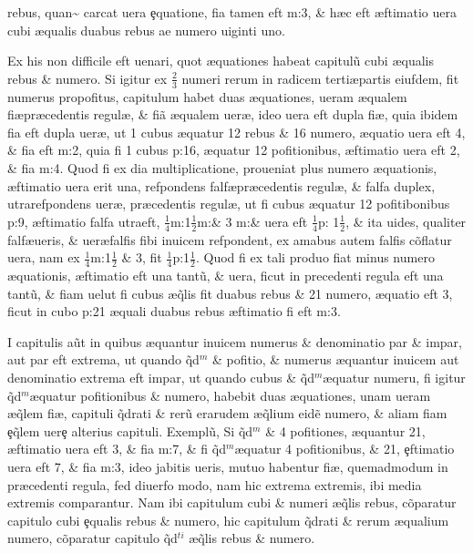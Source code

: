 rebus, quan\~{\que} carcat uera \c{e}quatione, fi{\ct}a tamen eft m:3, \& h{\ae}c eft {\ae}ftimatio uera cubi {\ae}qualis duabus rebus ae numero uiginti uno.

 Ex his non difficile eft uenari, quot {\ae}quationes habeat capitul\~{u} cubi {\ae}qualis rebus \& numero. Si igitur ex \( \tfrac{2}{3} \) numeri rerum in radicem terti\ae partis eiufdem, fit numerus propofitus, capitulum habet duas {\ae}quationes, ueram {\ae}qualem fi{\ct}\ae pr{\ae}cedentis regul{\ae}, \& fi{\ct}\~{a} {\ae}qualem uer{\ae}, ideo uera eft dupla fi{\ct\ae}, quia ibidem fi{\ct}a eft dupla uer{\ae}, ut 1 cubus {\ae}quatur 12 rebus \& 16 numero, {\ae}quatio uera eft 4, \& fi{\ct}a eft m:2, quia fi 1 cubus p:16, {\ae}quatur 12 pofitionibus, {\ae}ftimatio uera eft 2, \& fi{\ct}a m:4. Quod fi ex di{\ct}a multiplicatione, proueniat plus numero {\ae}quationis, {\ae}ftimatio uera erit una, refpondens falf\ae pr{\ae}cedentis regul{\ae}, \& falfa duplex, utra\que refpondens uer{\ae}, pr{\ae}cedentis regul{\ae}, ut fi cubus {\ae}quatur 12 pofitibonibus p:9, {\ae}ftimatio falfa utra\que eft, \( \tfrac{1}{4} \)m:1\( \tfrac{1}{2} \)m:\& 3 m:\& uera eft \( \tfrac{1}{4} \)p: 1\( \tfrac{1}{2} \), \& ita uides, qualiter falf\ae ueris, \& uer\ae  falfis fibi inuicem refpondent, ex amabus autem falfis c\~{o}flatur uera, nam ex \( \tfrac{1}{4} \)m:1\( \tfrac{1}{2} \) \& 3, fit \( \tfrac{1}{4} \)p:1\( \tfrac{1}{2} \). Quod fi ex tali produ{\ct}o fiat minus numero {\ae}quationis, {\ae}ftimatio eft una  tant\~{u}, \& uera, ficut in precedenti regula eft una tant\~{u}, \& fi{\ct}am uelut fi cubus {\ae}\~{q}lis fit duabus rebus \& 21 numero, {\ae}quatio eft 3, ficut in cubo p:21 {\ae}quali duabus rebus {\ae}ftimatio fi{\ct} eft m:3. 

 I capitulis a\~{u}t in quibus {\ae}quantur  inuicem numerus \& denominatio par \& impar, aut par eft extrema, ut quando \~{q}d\( ^m \) \& pofitio, \& numerus {\ae}quantur inuicem aut denominatio extrema eft impar, ut quando cubus \& \~{q}d\( ^m \){\ae}quatur numeru, fi igitur \~{q}d\( ^m \){\ae}quatur pofitionibus \& numero, habebit duas {\ae}quationes, unam ueram {\ae}\~{q}lem fi{\ct}{\ae}, capituli \~{q}drati \& rer\~{u} erarudem {\ae}\~{q}lium eid\~{e} numero, \& aliam fi{\ct}am \c{e}\~{q}lem uer\c{e} alterius capituli. Exempl\~{u}, Si \~{q}d\( ^m \) \& 4 pofitiones, {\ae}quantur 21, {\ae}ftimatio uera eft 3, \& fi{\ct}a m:7, \& fi \~{q}d\( ^m \){\ae}quatur 4 pofitionibus, \& 21, \c{e}ftimatio uera eft 7, \& fi{\ct}a m:3, ideo jabitis ueris, mutuo habentur fi{\ct}{\ae}, quemadmodum in pr{\ae}cedenti regula, fed diuerfo modo, nam hic extrema extremis, ibi media extremis comparantur. Nam ibi capitulum cubi \& numeri {\ae}\~{q}lis rebus, c\~{o}paratur capitulo cubi \c{e}qualis rebus \& numero, hic capitulum \~{q}drati \& rerum {\ae}qualium numero, c\~{o}paratur capitulo \~{q}d\( ^{ti} \) {\ae}\~{q}lis rebus \& numero.

